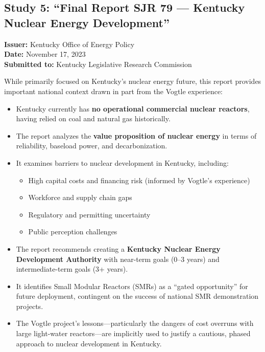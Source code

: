 \documentclass[12pt,a4paper]{article}
\begin{document}
\subsection{Study 5: ``Final Report SJR 79 --- Kentucky Nuclear Energy Development''}

\textbf{Issuer:} Kentucky Office of Energy Policy\\
\textbf{Date:} November 17, 2023\\
\textbf{Submitted to:} Kentucky Legislative Research Commission

While primarily focused on Kentucky's nuclear energy future, this report provides
important national context drawn in part from the Vogtle experience:

\begin{itemize}
    \item Kentucky currently has \textbf{no operational commercial nuclear reactors},
          having relied on coal and natural gas historically.
    \item The report analyzes the \textbf{value proposition of nuclear energy} in terms
          of reliability, baseload power, and decarbonization.
    \item It examines barriers to nuclear development in Kentucky, including:
    \begin{itemize}
        \item High capital costs and financing risk (informed by Vogtle's experience)
        \item Workforce and supply chain gaps
        \item Regulatory and permitting uncertainty
        \item Public perception challenges
    \end{itemize}
    \item The report recommends creating a \textbf{Kentucky Nuclear Energy Development
          Authority} with near-term goals (0--3 years) and intermediate-term goals (3+ years).
    \item It identifies Small Modular Reactors (SMRs) as a ``gated opportunity''
          for future deployment, contingent on the success of national SMR demonstration
          projects.
    \item The Vogtle project's lessons---particularly the dangers of cost overruns with
          large light-water reactors---are implicitly used to justify a cautious, phased
          approach to nuclear development in Kentucky.
\end{itemize}
\end{document}
